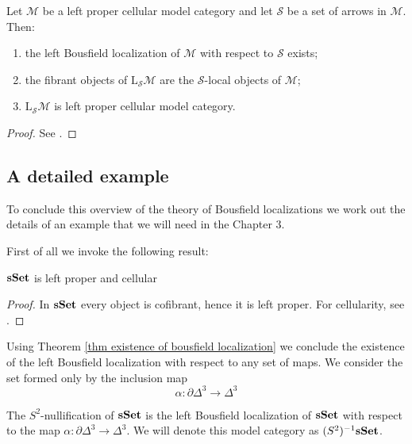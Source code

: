 \begin{refsection}
\begin{thm} \label{thm existence of bousfield localization}
Let $\mathcal M$ be a left proper cellular model category and let $\mathcal S$ be a set of arrows in $\mathcal M$. Then:
\begin{enumerate}
\item the left Bousfield localization of $\mathcal M$ with respect to $\mathcal S$ exists;
\item the fibrant objects of $\mathrm L_{\mathcal S} \mathcal M$ are the $\mathcal S$-local objects of $\mathcal M$;
\item $\mathrm L_{\mathcal S} \mathcal M$ is left proper cellular model category.
\end{enumerate}
\end{thm}

\begin{proof}
See \cite[Theorem 4.1.1]{hirschhorn}.
\end{proof}

\subsection{A detailed example}

To conclude this overview of the theory of Bousfield localizations we work out the details of an example that we will need in the Chapter 3.

First of all we invoke the following result:

\begin{thm}
$\mathbf{s\,\!\mathbf{Set}}$ is left proper and cellular
\end{thm}

\begin{proof}
In $\mathbf{s\,\!\mathbf{Set}}$ every object is cofibrant, hence it is left proper. For cellularity, see \cite[Proposition 12.1.4]{hirschhorn}.
\end{proof}

Using Theorem \ref{thm existence of bousfield localization} we conclude the existence of the left Bousfield localization with respect to any set of maps. We consider the set formed only by the inclusion map
\[
\alpha \colon \partial \Delta^3 \to \Delta^3
\]

\begin{defin}
The $S^2$-nullification of $\mathbf{s\,\!\mathbf{Set}}$ is the left Bousfield localization of $\mathbf{s\,\!\mathbf{Set}}$ with respect to the map $\alpha \colon \partial \Delta^3 \to \Delta^3$. We will denote this model category as $(S^2)^{-1} \mathbf{s\,\!\mathbf{Set}}$.
\end{defin}


\end{refsection}
